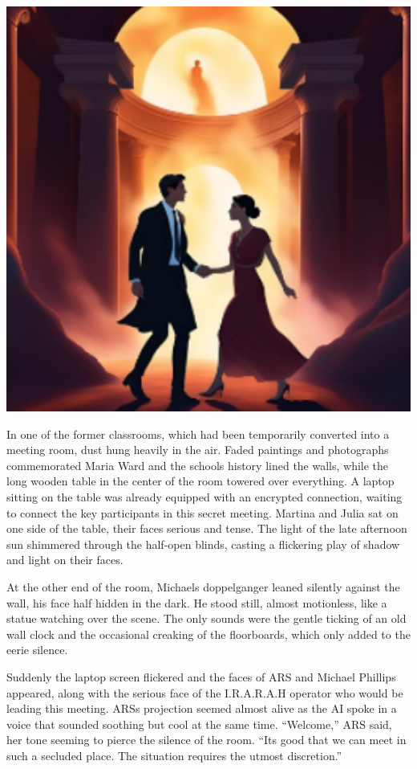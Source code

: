 \documentclass[
]{article}
\begin{document}
\includegraphics[width=5.65625in,height=5.25in]{media/image8.png}

In one of the former classrooms, which had been temporarily converted
into a meeting room, dust hung heavily in the air. Faded paintings and
photographs commemorated Maria Ward and the school\textquotesingle s
history lined the walls, while the long wooden table in the center of
the room towered over everything. A laptop sitting on the table was
already equipped with an encrypted connection, waiting to connect the
key participants in this secret meeting. Martina and Julia sat on one
side of the table, their faces serious and tense. The light of the late
afternoon sun shimmered through the half-open blinds, casting a
flickering play of shadow and light on their faces.

At the other end of the room, Michael\textquotesingle s doppelganger
leaned silently against the wall, his face half hidden in the dark. He
stood still, almost motionless, like a statue watching over the scene.
The only sounds were the gentle ticking of an old wall clock and the
occasional creaking of the floorboards, which only added to the eerie
silence.

Suddenly the laptop screen flickered and the faces of ARS and Michael
Phillips appeared, along with the serious face of the I.R.A.R.A.H
operator who would be leading this meeting. ARS\textquotesingle s
projection seemed almost alive as the AI \hspace{0pt}\hspace{0pt}spoke
in a voice that sounded soothing but cool at the same time. ``Welcome,''
ARS said, her tone seeming to pierce the silence of the room.
``It\textquotesingle s good that we can meet in such a secluded place.
The situation requires the utmost discretion.''
\end{document}
